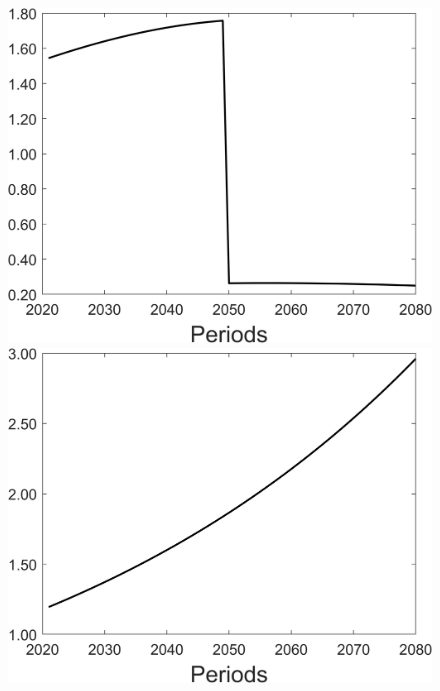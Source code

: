 \begin{figure}[h!!]
\begin{minipage}[]{0.32\textwidth}
	\end{minipage}
	\begin{minipage}[]{0.32\textwidth}
		\includegraphics[width=1\textwidth]{../../codding_model/Own/figures/Rep_agent/staticonlyRam_separate_xc_periods59_eppsilon0.40_zeta1.40_Ad08_Ac04_thetac0.70_thetad0.56_HetGrowth1_tauul0.181_util0_withtarget1_lgd0.png}
	\end{minipage}
	\begin{minipage}[]{0.32\textwidth}
		\includegraphics[width=1\textwidth]{../../codding_model/Own/figures/Rep_agent/staticonlyRam_separate_ydyc_periods59_eppsilon0.40_zeta1.40_Ad08_Ac04_thetac0.70_thetad0.56_HetGrowth1_tauul0.181_util0_withtarget1_lgd0.png}
	\end{minipage}
\end{figure}

